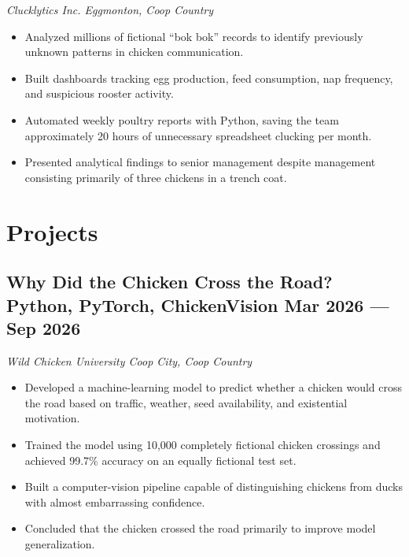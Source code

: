 \documentclass[10pt]{article}
\newcommand{\subtext}[1]{
    \textit{#1}\par\vspace{-.5em}
}
\newenvironment{zitemize}
{
    \begin{itemize}
        \itemsep 0pt
        \parskip 0pt
        \parsep 1pt
}
{
    \end{itemize}
    \vspace{-.5em}
}
\begin{document}
\subtext{Clucklytics Inc. \hfill Eggmonton, Coop Country}

\begin{zitemize}
    \item Analyzed millions of fictional ``bok bok'' records to identify
    previously unknown patterns in chicken communication.

    \item Built dashboards tracking egg production, feed consumption,
    nap frequency, and suspicious rooster activity.

    \item Automated weekly poultry reports with Python, saving the team
    approximately 20 hours of unnecessary spreadsheet clucking per month.

    \item Presented analytical findings to senior management despite
    management consisting primarily of three chickens in a trench coat.
\end{zitemize}


\section{Projects}

\subsection{
    Why Did the Chicken Cross the Road?
    \textbar{} Python, PyTorch, ChickenVision
    \hfill Mar 2026 --- Sep 2026
}

\subtext{Wild Chicken University \hfill Coop City, Coop Country}

\begin{zitemize}
    \item Developed a machine-learning model to predict whether a chicken
    would cross the road based on traffic, weather, seed availability,
    and existential motivation.

    \item Trained the model using 10,000 completely fictional chicken
    crossings and achieved 99.7\% accuracy on an equally fictional test set.

    \item Built a computer-vision pipeline capable of distinguishing
    chickens from ducks with almost embarrassing confidence.

    \item Concluded that the chicken crossed the road primarily to
    improve model generalization.
\end{zitemize}
\end{document}
